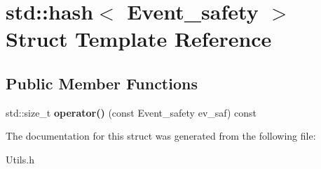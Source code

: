 \hypertarget{structstd_1_1hash_3_01Event__safety_01_4}{}\section{std\+:\+:hash$<$ Event\+\_\+safety $>$ Struct Template Reference}
\label{structstd_1_1hash_3_01Event__safety_01_4}
\subsection*{Public Member Functions}
\begin{DoxyCompactItemize}
\item 
\mbox{\label{structstd_1_1hash_3_01Event__safety_01_4_a3b69e1aec0b20037d333d41669467ae4}} 
std\+::size\+\_\+t {\bfseries operator()} (const Event\+\_\+safety ev\+\_\+saf) const
\end{DoxyCompactItemize}


The documentation for this struct was generated from the following file\+:\begin{DoxyCompactItemize}
\item 
Utils.\+h\end{DoxyCompactItemize}
